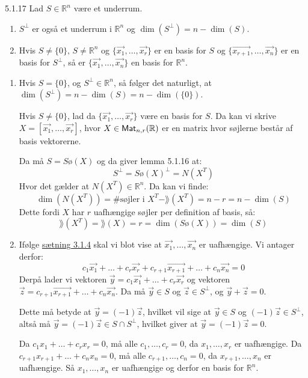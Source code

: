 \begin{saetning}{5.1.17}
	Lad $S \in \mathbb{R}^n$ være et underrum.
	\begin{enumerate}
		\item $S^\bot$ er også et underrum i $\mathbb{R}^n$ og $\dim(S^\bot) =
			n - \dim(S)$.
		\item Hvis $S \not= \{0\},\, S \not= \mathbb{R}^n$ og $\{\vec{x_1}, 
			\dotsc, \vec{x_r}\}$ er en basis for $S$ og $\{\vec{x_{r+1}}, 
			\dotsc, \vec{x_n}\}$ er en basis for $S^\bot$, så er $\{\vec{x_1}, 
			\dotsc, \vec{x_n}\}$ en basis for $\mathbb{R}^n$.
	\end{enumerate}
\end{saetning}

\begin{bevis}
	\begin{enumerate}
		\item Hvis $S = \{0\}$, og $S^\bot \in \mathbb{R}^n$, så følger det 
			naturligt, at $\dim(S^\bot) = n - \dim(S) = n - \dim(\{0\})$.

			Hvis $S \not= \{0\}$, lad da $\{\vec{x_1}, \dotsc, \vec{x_r}\}$ 
			være en basis for $S$. Da kan vi skrive $X = [\vec{x_1}, \dotsc, 
			\vec{x_r}]$, hvor $X \in \textsf{Mat}_{n,r}(\mathbb{R})$ er en matrix 
			hvor søjlerne består af basis vektorerne.

			Da må $S = S\text{ø}(X)$ og da giver lemma 5.1.16 at:
			\[
				S^\bot = S\text{ø}(X)^\bot = N(X^T)
			\]
			Hvor det gælder at $N(X^T) \in \mathbb{R}^n$. Da kan vi finde:
			\[
				\dim(N(X^T)) = \text{\#søjler i } X^T-\rang(X^T) = n-r = 
				n - \dim(S)
			\]
			Dette fordi $X$ har $r$ uafhængige søjler per definition af basis, 
			så:
			\[
				\rang(X^T) = \rang(X) = r = \dim(S\text{ø}(X)) = \dim(S)
			\]
		\item Ifølge \hyperlink{3.1.4}{sætning 3.1.4} skal vi blot vise at 
			$\vec{x_1}, \dotsc, \vec{x_n}$ er uafhængige.
			Vi antager derfor:
			\[
				c_1\vec{x_1} + \dotsc + c_r\vec{x_r} + c_{r+1}\vec{x_{r+1}} + 
				\dotsc + c_n\vec{x_n} = 0
			\]
			Derpå lader vi vektoren $\vec{y} = c_1\vec{x_1} + \dotsc + 
			c_r\vec{x_r}$ og vektoren $\vec{z} = c_{r+1}\vec{x_{r+1}} + 
			\dotsc + c_n\vec{x_n}$. Da må $\vec{y} \in S$ og $\vec{z} \in 
			S^\bot$, og $\vec{y} + \vec{z} = 0$.

			Dette må betyde at $\vec{y} = (-1)\vec{z}$, hvilket vil sige at 
			$\vec{y} \in S$ og $(-1)\vec{z} \in S^\bot$, altså må $\vec{y} = 
			(-1)\vec{z} \in S \cap S^\bot$, hvilket giver at $\vec{y} = 
			(-1)\vec{z} = 0$.

			Da $c_1x_1 + \dotsc + c_rx_r = 0$, må alle $c_1, \dotsc, c_r = 0$,
			da $x_1, \dotsc, x_r$ er uafhængige. Da $c_{r+1}x_{r+1} + \dotsc + 
			c_nx_n = 0$, må alle $c_{r+1}, \dotsc, c_n = 0$, da $x_{r+1}, 
			\dotsc, x_n$ er uafhængige. Så $x_1, \dotsc, x_n$ er uafhængige og
			derfor en basis for $\mathbb{R}^n$.
	\end{enumerate}
\end{bevis}
